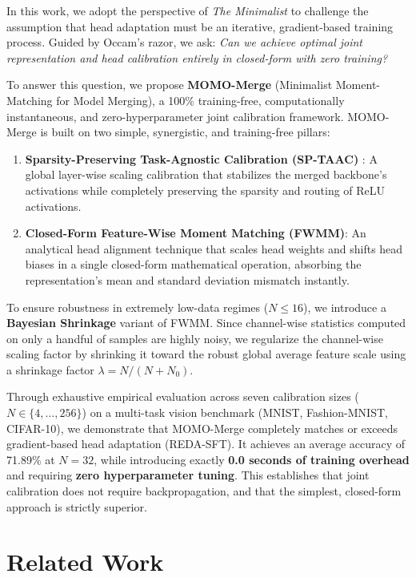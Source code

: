 \documentclass{article}
\theoremstyle{plain}
\theoremstyle{definition}
\theoremstyle{remark}
\begin{document}
In this work, we adopt the perspective of \emph{The Minimalist} to challenge the assumption that head adaptation must be an iterative, gradient-based training process. Guided by Occam's razor, we ask: \emph{Can we achieve optimal joint representation and head calibration entirely in closed-form with zero training?}

To answer this question, we propose \textbf{MOMO-Merge} (Minimalist Moment-Matching for Model Merging), a 100\% training-free, computationally instantaneous, and zero-hyperparameter joint calibration framework. MOMO-Merge is built on two simple, synergistic, and training-free pillars:
\begin{enumerate}
  \item \textbf{Sparsity-Preserving Task-Agnostic Calibration (SP-TAAC)} \cite{SPTAAC26}: A global layer-wise scaling calibration that stabilizes the merged backbone's activations while completely preserving the sparsity and routing of ReLU activations.
  \item \textbf{Closed-Form Feature-Wise Moment Matching (FWMM)}: An analytical head alignment technique that scales head weights and shifts head biases in a single closed-form mathematical operation, absorbing the representation's mean and standard deviation mismatch instantly.
\end{enumerate}

To ensure robustness in extremely low-data regimes ($N \le 16$), we introduce a \textbf{Bayesian Shrinkage} variant of FWMM. Since channel-wise statistics computed on only a handful of samples are highly noisy, we regularize the channel-wise scaling factor by shrinking it toward the robust global average feature scale using a shrinkage factor $\lambda = N / (N + N_0)$.

Through exhaustive empirical evaluation across seven calibration sizes ($N \in \{4, \dots, 256\}$) on a multi-task vision benchmark (MNIST, Fashion-MNIST, CIFAR-10), we demonstrate that MOMO-Merge completely matches or exceeds gradient-based head adaptation (REDA-SFT). It achieves an average accuracy of 71.89\% at $N=32$, while introducing exactly \textbf{0.0 seconds of training overhead} and requiring \textbf{zero hyperparameter tuning}. This establishes that joint calibration does not require backpropagation, and that the simplest, closed-form approach is strictly superior.

\section{Related Work}
\label{sec:related}
\end{document}
